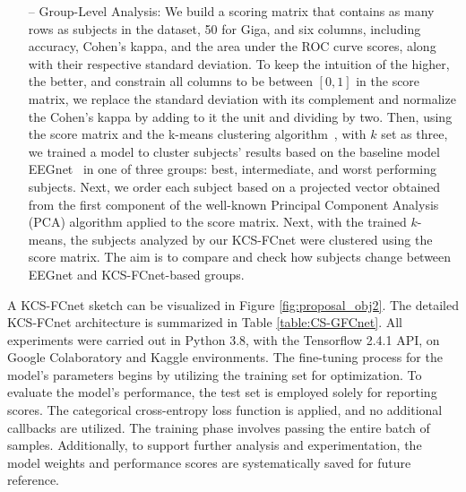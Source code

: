 \begin{itemize}
    \item[--] {{Group-Level Analysis:}}  We build a scoring matrix that contains as many rows as subjects in the dataset, 50 for Giga, and six columns, including accuracy, Cohen's kappa, and the area under the ROC curve scores, along with their respective standard deviation. To keep the intuition of the higher, the better, and constrain all columns to be between $[0,1]$ in the score matrix, we replace the standard deviation with its complement and normalize the Cohen's kappa by adding to it the unit and dividing by two. Then, using the score matrix and the k-means clustering algorithm~\cite{geron2022hands}, with $k$ set as three, we trained a model to cluster subjects' results based on the baseline model EEGnet~\cite{lawhern2018eegnet} in one of three groups: best, intermediate, and worst performing subjects. Next, we order each subject based on a projected vector obtained from the first component of the well-known Principal Component Analysis (PCA) algorithm applied to the score matrix. Next, with the trained $k$-means, the subjects analyzed by our KCS-FCnet were clustered using the score matrix. The aim is to compare and check how subjects change between EEGnet and KCS-FCnet-based groups. 
\end{itemize}    
	
A KCS-FCnet sketch can be visualized in Figure \ref{fig:proposal_obj2}. The detailed KCS-FCnet architecture is summarized in Table \ref{table:CS-GFCnet}. All experiments were carried out in{ Python 3.8}, with the {Tensorflow 2.4.1 API}, on Google Colaboratory and Kaggle environments. The fine-tuning process for the model's parameters begins by utilizing the training set for optimization. To evaluate the model's performance, the test set is employed solely for reporting scores. The categorical cross-entropy loss function is applied, and no additional callbacks are utilized. The training phase involves passing the entire batch of samples. Additionally, to support further analysis and experimentation, the model weights and performance scores are systematically saved for future reference.

